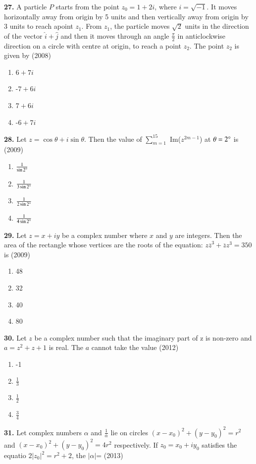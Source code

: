 \documentclass[journal,12pt,twocolumn]{IEEEtran}
\theoremstyle{remark}
\begin{document}
\textbf{27.} A particle $P$ starts from the point $z_{0}=1+2i$, where $i=\sqrt{-1}$. It moves horizontally away from origin by 5 units and then vertically away from origin by 3 units to reach apoint $z_{1}$. From $z_{1}$, the particle moves $\sqrt{2}$ units in the direction of the vector $\hat{i}+\hat{j}$ and then it moves through an angle $\frac{\pi}{2}$ in anticlockwise direction on a circle with centre at origin, to reach a point $z_{2}$. The point $z_{2}$ is given by \hfill{(2008)}
\begin{enumerate}[label=(\alph*)]
	\item $6+7i$
	\item -$7+6i$
	\item $7+6i$
	\item -$6+7i$
\end{enumerate}
\textbf{28.} Let $z=\cos\theta+i\sin\theta$. Then the value of $\sum_{m=1} ^{15}$ Im($z^{2m-1}$) at $\theta=2\degree$ is \hfill{(2009)}
\begin{enumerate}[label=(\alph*)]
	\item $\frac{1}{\sin 2\degree}$
	\item $\frac{1}{3\sin 2\degree}$
	\item $\frac{1}{2\sin 2\degree}$
	\item $\frac{1}{4\sin 2\degree}$
\end{enumerate}
\textbf{29.} Let $z=x+iy$ be a complex number where $x$ and $y$ are integers. Then the area of the rectangle whose vertices are the roots of the equation: $z\overline{z}^{3}+\overline{z}z^{3}=350$ is \hfill{(2009)}
\begin{enumerate}[label=(\alph*)]
	\item 48
	\item 32
	\item 40
	\item 80
\end{enumerate}
\textbf{30.} Let $z$ be a complex number such that the imaginary part of z is non-zero and $a=z^{2}+z+1$ is real. The $a$ cannot take the value \hfill{(2012)}
\begin{enumerate}[label=(\alph*)]
	\item -1
	\item $\frac{1}{3}$
	\item $\frac{1}{2}$
	\item $\frac{3}{4}$
\end{enumerate}
\textbf{31.} Let complex numbers $\alpha$ and $\frac{1}{\overline{\alpha}}$ lie on circles $(x-x_{0})^{2}+(y-y_{0})^{2}=r^{2}$ and $(x-x_{0})^{2}+(y-y_{0})^{2}=4r^{2}$ respectively. If $z_{0}=x_{0}+iy_{0}$ satisfies the equatio  $2|z_{0}| ^{2}=r^{2}+2$, the $|\alpha|$= \hfill{(2013)}
\end{document}

